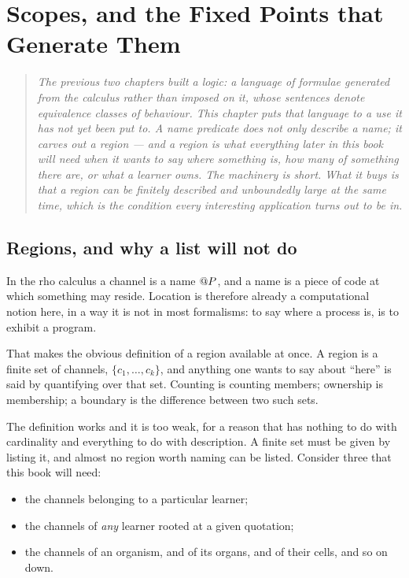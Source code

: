\chapter{Scopes, and the Fixed Points that Generate Them}
\label{ch:scope}

\begin{quote}\itshape\small
The previous two chapters built a logic: a language of formulae generated
from the calculus rather than imposed on it, whose sentences denote
equivalence classes of behaviour. This chapter puts that language to a use
it has not yet been put to. A name predicate does not only describe a
name; it carves out a \emph{region} --- and a region is what everything
later in this book will need when it wants to say where something is, how
many of something there are, or what a learner owns. The machinery is
short. What it buys is that a region can be finitely described and
unboundedly large at the same time, which is the condition every
interesting application turns out to be in.
\end{quote}

\section{Regions, and why a list will not do}

In the rho calculus a channel is a name $@P$, and a name is a piece
of code at which something may reside. Location is therefore already a
computational notion here, in a way it is not in most formalisms: to say
where a process is, is to exhibit a program.

That makes the obvious definition of a region available at once. A region
is a finite set of channels, $\{c_1, \dots, c_k\}$, and anything one wants
to say about ``here'' is said by quantifying over that set. Counting is
counting members; ownership is membership; a boundary is the difference
between two such sets.

The definition works and it is too weak, for a reason that has nothing to
do with cardinality and everything to do with description. A finite set
must be given by listing it, and almost no region worth naming can be
listed. Consider three that this book will need:

\begin{itemize}\itemsep2pt
\item the channels belonging to a particular learner;
\item the channels of \emph{any} learner rooted at a given quotation;
\item the channels of an organism, and of its organs, and of their cells,
      and so on down.
\end{itemize}

